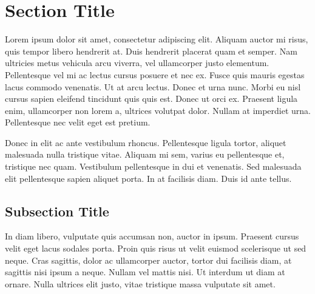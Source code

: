 \documentclass[
	letterpaper, %
	12pt, %
]{CSSullivanBusinessReport}
\begin{document}
\newpage


\section{Section Title} %

Lorem ipsum dolor sit amet, consectetur adipiscing elit. Aliquam auctor mi risus, quis tempor libero hendrerit at. Duis hendrerit placerat quam et semper. Nam ultricies metus vehicula arcu viverra, vel ullamcorper justo elementum. Pellentesque vel mi ac lectus cursus posuere et nec ex. Fusce quis mauris egestas lacus commodo venenatis. Ut at arcu lectus. Donec et urna nunc. Morbi eu nisl cursus sapien eleifend tincidunt quis quis est. Donec ut orci ex. Praesent ligula enim, ullamcorper non lorem a, ultrices volutpat dolor. Nullam at imperdiet urna. Pellentesque nec velit eget est pretium.

Donec in elit ac ante vestibulum rhoncus. Pellentesque ligula tortor, aliquet malesuada nulla tristique vitae. Aliquam mi sem, varius eu pellentesque et, tristique nec quam. Vestibulum pellentesque in dui et venenatis. Sed malesuada elit pellentesque sapien aliquet porta. In at facilisis diam. Duis id ante tellus. %

\subsection{Subsection Title} %

In diam libero, vulputate quis accumsan non, auctor in ipsum. Praesent cursus velit eget lacus sodales porta. Proin quis risus ut velit euismod scelerisque ut sed neque. Cras sagittis, dolor ac ullamcorper auctor, tortor dui facilisis diam, at sagittis nisi ipsum a neque. Nullam vel mattis nisi. Ut interdum ut diam at ornare. Nulla ultrices elit justo, vitae tristique massa vulputate sit amet.
\end{document}

